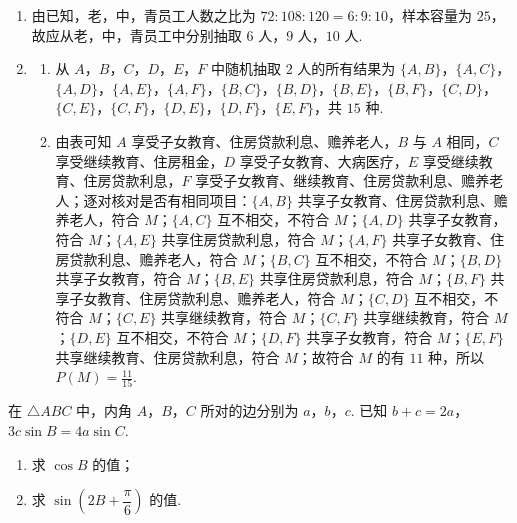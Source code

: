 \begin{solution}
\begin{enumerate}
\item 由已知，老，中，青员工人数之比为 \(72:108:120=6:9:10\)，样本容量为 \(25\)，故应从老，中，青员工中分别抽取 \(6\) 人，\(9\) 人，\(10\) 人.
\item
\begin{enumerate}
\item 从 \(A\)，\(B\)，\(C\)，\(D\)，\(E\)，\(F\) 中随机抽取 \(2\) 人的所有结果为 \(\{A,B\}\)，\(\{A,C\}\)，\(\{A,D\}\)，\(\{A,E\}\)，\(\{A,F\}\)，\(\{B,C\}\)，\(\{B,D\}\)，\(\{B,E\}\)，\(\{B,F\}\)，\(\{C,D\}\)，\(\{C,E\}\)，\(\{C,F\}\)，\(\{D,E\}\)，\(\{D,F\}\)，\(\{E,F\}\)，共 \(15\) 种.
\item 由表可知 \(A\) 享受子女教育、住房贷款利息、赡养老人，\(B\) 与 \(A\) 相同，\(C\) 享受继续教育、住房租金，\(D\) 享受子女教育、大病医疗，\(E\) 享受继续教育、住房贷款利息，\(F\) 享受子女教育、继续教育、住房贷款利息、赡养老人；逐对核对是否有相同项目：\(\{A,B\}\) 共享子女教育、住房贷款利息、赡养老人，符合 \(M\)；\(\{A,C\}\) 互不相交，不符合 \(M\)；\(\{A,D\}\) 共享子女教育，符合 \(M\)；\(\{A,E\}\) 共享住房贷款利息，符合 \(M\)；\(\{A,F\}\) 共享子女教育、住房贷款利息、赡养老人，符合 \(M\)；\(\{B,C\}\) 互不相交，不符合 \(M\)；\(\{B,D\}\) 共享子女教育，符合 \(M\)；\(\{B,E\}\) 共享住房贷款利息，符合 \(M\)；\(\{B,F\}\) 共享子女教育、住房贷款利息、赡养老人，符合 \(M\)；\(\{C,D\}\) 互不相交，不符合 \(M\)；\(\{C,E\}\) 共享继续教育，符合 \(M\)；\(\{C,F\}\) 共享继续教育，符合 \(M\)；\(\{D,E\}\) 互不相交，不符合 \(M\)；\(\{D,F\}\) 共享子女教育，符合 \(M\)；\(\{E,F\}\) 共享继续教育、住房贷款利息，符合 \(M\)；故符合 \(M\) 的有 \(11\) 种，所以 \(P\left(M\right)=\frac{11}{15}\).
\end{enumerate}
\end{enumerate}
\end{solution}

\begin{problem}
在 \(\triangle ABC\) 中，内角 \(A\)，\(B\)，\(C\) 所对的边分别为 \(a\)，\(b\)，\(c\). 已知 \(b+c=2a\)，\(3c\sin B=4a\sin C\).

\begin{enumerate}
\item 求 \(\cos B\) 的值；
\item 求 \(\sin\left(2B+\dfrac{\pi}{6}\right)\) 的值.
\end{enumerate}
\end{problem}

